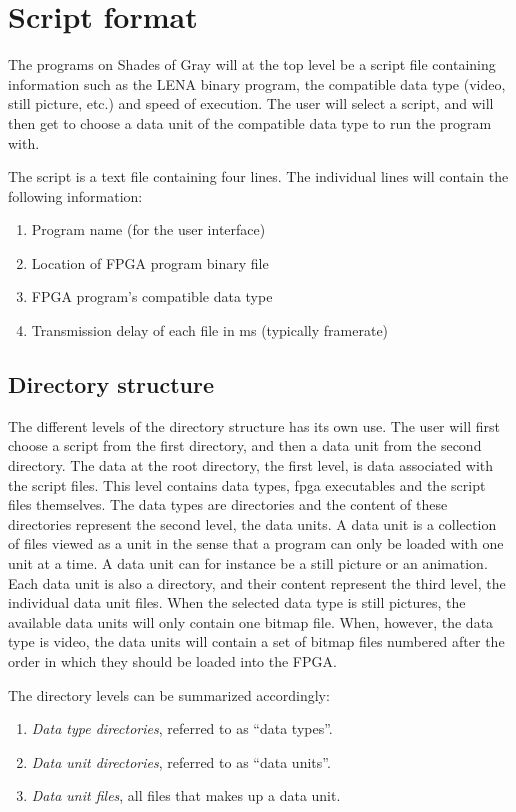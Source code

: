 \section{Script format}

The programs on { Shades of Gray} will at the top level be a script file containing information such as the LENA binary program, the compatible data type (video, still picture, etc.) and speed of execution. The user will select a script, and will then get to choose a data unit of the compatible data type to run the program with.

The script is a text file containing four lines. The individual lines will contain the following information:

\begin{enumerate}
\item Program name (for the user interface)
\item Location of FPGA program binary file
\item FPGA program's compatible data type
\item Transmission delay of each file in ms (typically framerate)
\end{enumerate}

\subsection{Directory structure}

The different levels of the directory structure has its own use. The user will first choose a script from the first directory, and then a data unit from the second directory. The data at the root directory, the first level, is data associated with the script files. This level contains data types, fpga executables and the script files themselves. The data types are directories and the content of these directories represent the second level, the data units. A data unit is a collection of files viewed as a unit in the sense that a program can only be loaded with one unit at a time. A data unit can for instance be a still picture or an animation. Each data unit is also a directory, and their content represent the third level, the individual data unit files. When the selected data type is still pictures, the available data units will only contain one bitmap file. When, however, the data type is video, the data units will contain a set of bitmap files numbered after the order in which they should be loaded into the FPGA. %

The directory levels can be summarized accordingly:
\begin{enumerate}
\item \emph{Data type directories}, referred to as ``data types''.
\item \emph{Data unit directories}, referred to as ``data units''.
\item \emph{Data unit files}, all files that makes up a data unit.
\end{enumerate}
 
